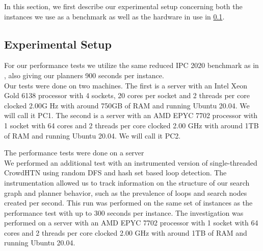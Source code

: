 In this section, we first describe our experimental setup concerning both the instances we use as a benchmark as well as the hardware in use in \ref{eval: setup}.

\subsection{Experimental Setup}
\label{eval: setup}
For our performance tests we utilize the same reduced IPC 2020 benchmark as in \cite{bretl2021parallel}, also giving our planners 900 seconds per instance. \\
Our tests were done on two machines. The first is a server with an Intel Xeon Gold 6138 processor with 4 sockets, 20 cores per socket and 2 threads per core clocked 2.00G Hz with around 750GB of RAM and running Ubuntu 20.04. We will call it PC1. The second is a server with an AMD EPYC 7702 processor with 1 socket with 64 cores and 2 threads per core clocked 2.00 GHz with around 1TB of RAM and running Ubuntu 20.04. We will call it PC2.

The performance tests were done on a server \\
We performed an additional test with an instrumented version of single-threaded CrowdHTN using random DFS and hash set based loop detection. The instrumentation allowed us to track information on the structure of our search graph and planner behavior, such as the prevalence of loops and search nodes created per second. This run was performed on the same set of instances as the performance test with up to 300 seconds per instance. The investigation was performed on a server with an AMD EPYC 7702 processor with 1 socket with 64 cores and 2 threads per core clocked 2.00 GHz with around 1TB of RAM and running Ubuntu 20.04.


